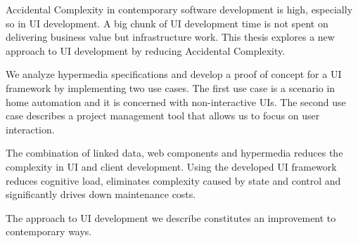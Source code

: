 Accidental Complexity in contemporary software development is high, especially so in UI development. A big chunk of UI development time is not spent on delivering business value but infrastructure work. This thesis explores a new approach to UI development by reducing Accidental Complexity.

We analyze \gls{hypermedia} specifications and develop a proof of concept for a UI framework by implementing two use cases. The first use case is a scenario in home automation and it is concerned with non-interactive UIs. The second use case describes a project management tool that allows us to focus on user interaction.

The combination of linked data, web components and hypermedia reduces the complexity in UI and client development. Using the developed UI framework reduces cognitive load, eliminates complexity caused by state and control and significantly drives down maintenance costs.

The approach to UI development we describe constitutes an improvement to contemporary ways.
